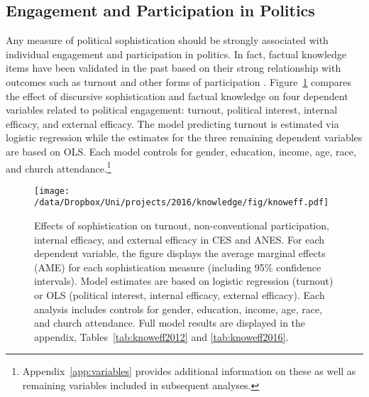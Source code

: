 \subsection*{Engagement and Participation in Politics}
Any measure of political sophistication should be strongly associated with individual engagement and participation in politics. In fact, factual knowledge items have been validated in the past based on their strong relationship with outcomes such as turnout and other forms of participation \citep[230--233]{lupia2015uninformed}. Figure~\ref{fig:knoweff} compares the effect of discursive sophistication and factual knowledge on four dependent variables related to political engagement: turnout, political interest, internal efficacy, and external efficacy. The model predicting turnout is estimated via logistic regression while the estimates for the three remaining dependent variables are based on OLS. Each model controls for gender, education, income, age, race, and church attendance.\footnote{Appendix~\ref{app:variables} provides additional information on these as well as remaining variables included in subsequent analyses.}

\begin{figure}[h]\centering
\texttt{[image: /data/Dropbox/Uni/projects/2016/knowledge/fig/knoweff.pdf]}
\caption[Effects of sophistication on turnout, non-conventional participation, internal efficacy, and external efficacy]{Effects of sophistication on turnout, non-conventional participation, internal efficacy, and external efficacy in CES and ANES. For each dependent variable, the figure displays the average marginal effects (AME) for each sophistication measure (including 95\% confidence intervals). Model estimates are based on logistic regression (turnout) or OLS (political interest, internal efficacy, external efficacy). Each analysis includes controls for gender, education, income, age, race, and church attendance. Full model results are displayed in the appendix, Tables~\ref{tab:knoweff2012} and \ref{tab:knoweff2016}.}\label{fig:knoweff}
\end{figure}


